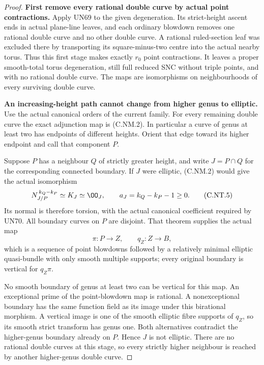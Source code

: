 \begin{proof}
\par\medskip\noindent\textbf{First remove every rational double curve by actual point contractions.}
Apply UN69 to the given degeneration. Its strict-height
ascent ends in actual plane-line leaves, and each ordinary
blowdown removes one rational double curve and no other
double curve. A rational ruled-section leaf was excluded
there by transporting its square-minus-two centre into
the actual nearby torus. Thus this first stage makes
exactly $r_0$ point contractions. It leaves a proper
smooth-total torus degeneration, still full reduced
SNC without triple points, and with no rational double
curve. The maps are isomorphisms on neighbourhoods of
every surviving double curve.

\par\medskip\noindent\textbf{An increasing-height path cannot change from higher genus to elliptic.}
Use the actual canonical orders of the current family.
For every remaining double curve the exact adjunction
map is (C.NM.2). In particular a curve of genus at least
two has endpoints of different heights. Orient that
edge toward its higher endpoint and call that component
$P$.

Suppose $P$ has a neighbour $Q$ of strictly greater
height, and write $J=P\cap Q$ for the corresponding
connected boundary. If $J$ were elliptic, (C.NM.2)
would give the actual isomorphism
\[
      N_{J/P}^{\,k_Q-k_P}\simeq K_J\simeq\OO_J,
        \qquad a_J=k_Q-k_P-1\ge0 .
\tag{C.NT.5}
\]
Its normal is therefore torsion, with the actual
canonical coefficient required by UN70. All boundary
curves on $P$ are disjoint. That theorem supplies
the actual map
\[
        \pi:P\longrightarrow Z,\qquad
        q_Z:Z\longrightarrow B,
\tag{C.NT.6}
\]
which is a sequence of point blowdowns followed by a
relatively minimal elliptic quasi-bundle with only
smooth multiple supports; every original boundary
is vertical for $q_Z\pi$.

No smooth boundary of genus at least two can be
vertical for this map. An exceptional prime of the
point-blowdown map is rational. A nonexceptional
boundary has the same function field as its image
under this birational morphism. A vertical image is
one of the smooth elliptic fibre supports of $q_Z$,
so its smooth strict transform has genus one.
Both alternatives contradict the higher-genus
boundary already on $P$. Hence $J$ is not elliptic.
There are no rational double curves at this stage,
so every strictly higher neighbour is reached by
another higher-genus double curve.


\end{proof}
